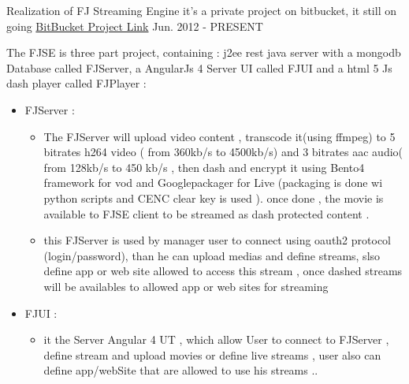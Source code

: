 


\begin{cventries}


\cventry
{Realization of FJ Streaming Engine} %
{it's a private project on bitbucket, it still on going } %
{ \href{https://bitbucket.org/account/user/easysoftin/projects/FJSE}{BitBucket Project Link} }%
{Jun. 2012 - PRESENT} %
{ %
\begin{cvitems}
\item {The FJSE is three part project, containing : j2ee rest java server  with a mongodb Database called FJServer, a AngularJs 4 Server UI called FJUI and a html 5 Js dash player called FJPlayer :}
\begin{itemize}
\item {  FJServer : }
\begin{itemize}
\item{ The FJServer will upload video content ,  transcode it(using ffmpeg) to 5 bitrates h264 video ( from 360kb/s to 4500kb/s) and 3 bitrates aac audio( from 128kb/s to 450 kb/s , then dash and encrypt it using Bento4 framework for vod and Googlepackager for Live (packaging is done wi python scripts and CENC clear key  is used ). once done , the movie is available to FJSE client to be streamed as dash protected content . }
\item {this FJServer is used by manager user to connect using oauth2 protocol (login/password), than he can upload medias and define streams, slso define app or web site allowed to access this stream , once dashed streams will be availables to allowed app or web sites for streaming}
\end{itemize}
\item {FJUI :}
\begin{itemize}
\item {it the Server Angular 4 UT , which allow User  to connect to FJServer , define stream and upload movies or define live streams  , user also can define app/webSite that are allowed to use his streams ..
}
\end{itemize}
\end{itemize}
\end{cvitems}}
\end{cventries}
